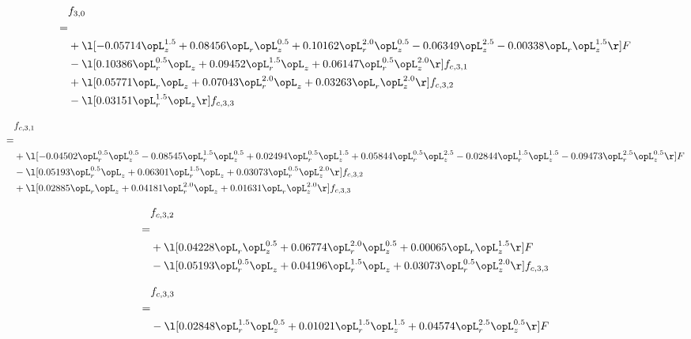 \begin{alignat}{2} 
\label{eq:f_30_2} 
& f_{3,0} \nonumber \\ 
 = \\ 
& + \l[  -0.05714 \opL_z^{1.5} +  0.08456 \opL_r \opL_z^{0.5} +  0.10162 \opL_r^{2.0} \opL_z^{0.5}   -0.06349 \opL_z^{2.5}   -0.00338 \opL_r \opL_z^{1.5}  \r] F \nonumber \\ 
& - \l[  0.10386 \opL_r^{0.5} \opL_z +  0.09452 \opL_r^{1.5} \opL_z +  0.06147 \opL_r^{0.5} \opL_z^{2.0}  \r] f_{c,3,1} \nonumber \\ 
& + \l[  0.05771 \opL_r \opL_z +  0.07043 \opL_r^{2.0} \opL_z +  0.03263 \opL_r \opL_z^{2.0}  \r] f_{c,3,2} \nonumber \\ 
& - \l[  0.03151 \opL_r^{1.5} \opL_z  \r] f_{c,3,3} \nonumber \\ 
\end{alignat} 


\begin{alignat}{2} 
\label{eq:f_31_2} 
& f_{c,3,1} \nonumber \\ 
 = \\ 
& + \l[  -0.04502 \opL_r^{0.5} \opL_z^{0.5}   -0.08545 \opL_r^{1.5} \opL_z^{0.5} +  0.02494 \opL_r^{0.5} \opL_z^{1.5} +  0.05844 \opL_r^{0.5} \opL_z^{2.5}   -0.02844 \opL_r^{1.5} \opL_z^{1.5}   -0.09473 \opL_r^{2.5} \opL_z^{0.5}  \r] F \nonumber \\ 
& - \l[  0.05193 \opL_r^{0.5} \opL_z +  0.06301 \opL_r^{1.5} \opL_z +  0.03073 \opL_r^{0.5} \opL_z^{2.0}  \r] f_{c,3,2} \nonumber \\ 
& + \l[  0.02885 \opL_r \opL_z +  0.04181 \opL_r^{2.0} \opL_z +  0.01631 \opL_r \opL_z^{2.0}  \r] f_{c,3,3} \nonumber \\ 
\end{alignat} 


\begin{alignat}{2} 
\label{eq:f_32_2} 
& f_{c,3,2} \nonumber \\ 
 = \\ 
& + \l[  0.04228 \opL_r \opL_z^{0.5} +  0.06774 \opL_r^{2.0} \opL_z^{0.5} +  0.00065 \opL_r \opL_z^{1.5}  \r] F \nonumber \\ 
& - \l[  0.05193 \opL_r^{0.5} \opL_z +  0.04196 \opL_r^{1.5} \opL_z +  0.03073 \opL_r^{0.5} \opL_z^{2.0}  \r] f_{c,3,3} \nonumber \\ 
\end{alignat} 


\begin{alignat}{2} 
\label{eq:f_33_2} 
& f_{c,3,3} \nonumber \\ 
 = \\ 
& - \l[  0.02848 \opL_r^{1.5} \opL_z^{0.5} +  0.01021 \opL_r^{1.5} \opL_z^{1.5} +  0.04574 \opL_r^{2.5} \opL_z^{0.5}  \r] F \nonumber \\ 
\end{alignat} 


